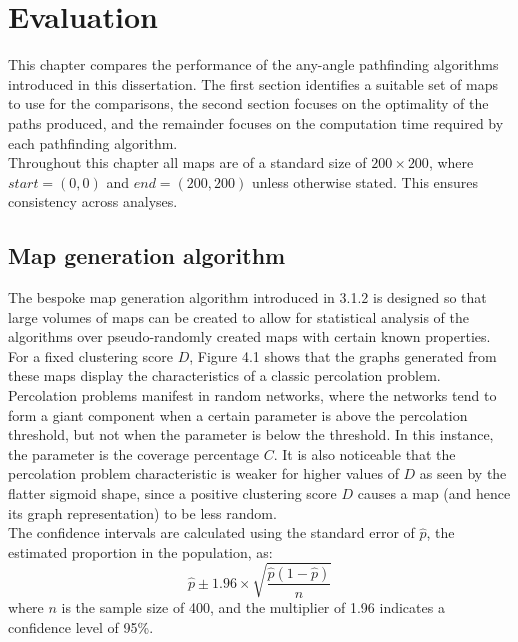 \documentclass[12pt,notitlepage]{report}
\begin{document}
\cleardoublepage
\chapter{Evaluation}

This chapter compares the performance of the any-angle pathfinding algorithms introduced in this dissertation. The first section identifies a suitable set of maps to use for the comparisons, the second section focuses on the optimality of the paths produced, and the remainder focuses on the computation time required by each pathfinding algorithm.\\

\noindent
Throughout this chapter all maps are of a standard size of $200 \times 200$, where $start=(0,0)$ and $end=(200,200)$ unless otherwise stated. This ensures consistency across analyses.

\section{Map generation algorithm}

The bespoke map generation algorithm introduced in 3.1.2 is designed so that large volumes of maps can be created to allow for statistical analysis of the algorithms over pseudo-randomly created maps with certain known properties.\\

\noindent
For a fixed clustering score $D$, Figure 4.1 shows that the graphs generated from these maps display the characteristics of a classic percolation problem\cite{Grimmett99}. Percolation problems manifest in random networks, where the networks tend to form a giant component when a certain parameter is above the percolation threshold, but not when the parameter is below the threshold. In this instance, the parameter is the coverage percentage $C$. It is also noticeable that the percolation problem characteristic is weaker for higher values of $D$ as seen by the flatter sigmoid shape, since a positive clustering score $D$ causes a map (and hence its graph representation) to be less random.\\

\noindent
The confidence intervals are calculated using the standard error of $\hat{p}$, the estimated proportion in the population\cite{PennState}, as:
\begin{equation}
\hat{p} \pm 1.96 \times \sqrt{\frac{\hat{p}(1-\hat{p})}{n}}
\end{equation}
where $n$ is the sample size of 400, and the multiplier of 1.96 indicates a confidence level of 95\%.\\
\end{document}
